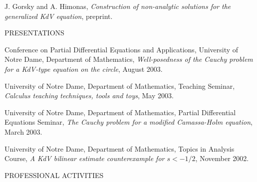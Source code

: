 \documentclass[11pt]{article}
\begin{document}
\vspace{0.1in}
\parbox[t]{0.5in}{\hspace{1in}}
\parbox[t]{6.5in}
     { J. Gorsky and A. Himonas, 
{\em Construction of non-analytic solutions for the generalized KdV
equation}, preprint.
}




   \vspace{0.3in}
{\bld PRESENTATIONS}


\vspace{0.1in}
\parbox[t]{0.5in}{\hspace{1in}}
\parbox[t]{6.5in}
     { Conference on Partial Differential Equations and Applications,
University of Notre Dame, Department of Mathematics,  {\em Well-posedness of
the Cauchy problem for a KdV-type equation on the circle}, August 2003.
}

\vspace{0.1in}
\parbox[t]{0.5in}{\hspace{1in}}
\parbox[t]{6.5in}
     {University of Notre Dame, Department
of Mathematics, Teaching Seminar,  {\em Calculus teaching
techniques, tools and toys}, May 2003. }



\vspace{0.1in}
\parbox[t]{0.5in}{\hspace{1in}}
\parbox[t]{6.5in}
     {University of Notre
Dame, Department
of Mathematics, Partial Differential Equations Seminar, {\em The Cauchy
problem for a modified Camassa-Holm equation}, March 2003. }

\vspace{0.1in}
\parbox[t]{0.5in}{\hspace{1in}}
\parbox[t]{6.5in}
     {University of Notre
Dame, Department of Mathematics, Topics
       in Analysis Course, {\em A KdV bilinear estimate counterexample
 for $s<-1/2$}, November 2002.
}










\vspace{0.3in}
{\bld PROFESSIONAL ACTIVITIES}
\end{document}

